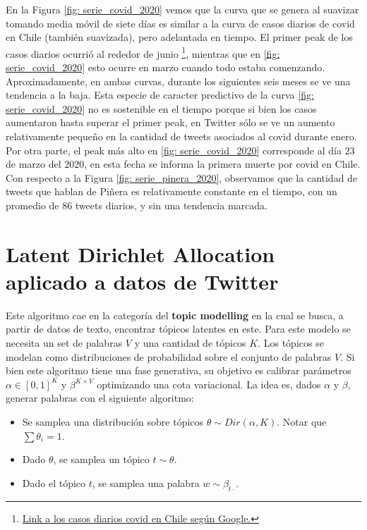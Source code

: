 \documentclass{article}
\begin{document}
\newpage


En la Figura \ref{fig: serie_covid_2020} vemos que la curva que se genera al suavizar tomando media móvil de siete días es similar a la curva de casos diarios de covid en Chile (también suavizada), pero adelantada en tiempo. El primer peak de los casos diarios ocurrió al rededor de junio \footnote{\href{https://www.google.com/search?client=firefox-b-d&q=covid+chile}{Link a los casos diarios covid en Chile según Google.}}, mientras que en \ref{fig: serie_covid_2020} esto ocurre en marzo cuando todo estaba comenzando. Aproximadamente, en ambas curvas, durante los siguientes seis meses se ve una tendencia a la baja. Esta especie de caracter predictivo de la curva \ref{fig: serie_covid_2020} no es sostenible en el tiempo porque si bien los casos aumentaron hasta superar el primer peak, en Twitter sólo se ve un aumento relativamente pequeño en la cantidad de tweets asociados al covid durante enero. Por otra parte, el peak más alto en \ref{fig: serie_covid_2020} corresponde al día $23$ de marzo del $2020$, en esta fecha se informa la primera muerte por covid en Chile.\\

Con respecto a la Figura \ref{fig: serie_pinera_2020}, observamos que la cantidad de tweets que hablan de Piñera es relativamente constante en el tiempo, con un promedio de $86$ tweets diarios, y sin una tendencia marcada. 
\newpage

\section{Latent Dirichlet Allocation aplicado a datos de Twitter}
	Este algoritmo cae en la categoría del \textbf{topic modelling} en la cual se busca, a partir de datos de texto, encontrar tópicos latentes en este. Para este modelo se necesita un set de palabras $V$ y una cantidad de tópicos $K$. Los tópicos se modelan como distribuciones de probabilidad sobre el conjunto de palabras $V$. Si bien este algoritmo tiene una fase generativa, su objetivo es calibrar parámetros $\alpha\in [0,1]^{K}$ y $\beta^{K\times V}$ optimizando una cota variacional. La idea es, dados $\alpha$ y $\beta$, generar palabras con el siguiente algoritmo:
	
	\begin{itemize}
		\item Se samplea una distribución sobre tópicos $\theta\sim Dir(\alpha, K)$. Notar que $\sum \theta_i = 1$.
		\item Dado $\theta$, se samplea un tópico $t\sim\theta$.
		\item Dado el tópico $t$, se samplea una palabra $w\sim\beta_{t\cdot}$.
	\end{itemize}
	
\end{document}
